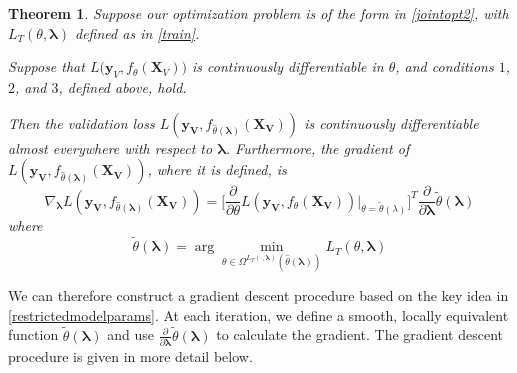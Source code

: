 \documentclass[10pt,letterpaper]{article}
\newtheorem{theorem}{Theorem}
\begin{document}
\begin{theorem}
Suppose our optimization problem is of the form in \eqref{jointopt2}, with $L_T\left(\theta, \boldsymbol{\lambda}\right)$ defined as in \eqref{train}.

Suppose that $L \Big( \boldsymbol{y}_V, f_{\theta}(\boldsymbol{X}_V)\Big)$ is continuously differentiable in $\theta$, and conditions $1$, $2$, and $3$, defined above, hold.

Then the validation loss $L(\boldsymbol{y_V}, f_{\hat \theta(\boldsymbol{\lambda})}(\boldsymbol{X_V}))$ is continuously differentiable almost everywhere with respect to $\boldsymbol{\lambda}$. Furthermore, the gradient of $L(\boldsymbol{y_V}, f_{\hat \theta(\boldsymbol{\lambda})}(\boldsymbol{X_V}))$, where it is defined, is
\begin{equation}
\nabla_{\boldsymbol{\lambda}} L(\boldsymbol{y_V}, f_{\hat \theta(\boldsymbol{\lambda})}(\boldsymbol{X_V})) = \Big [ \frac{\partial}{\partial \theta} L(\boldsymbol{y_V}, f_{\theta}(\boldsymbol{X_V})) |_{\theta=\tilde\theta(\lambda)} \Big ]^T \frac{\partial}{\partial \boldsymbol{\lambda}} \tilde{\theta}(\boldsymbol{\lambda})
\end{equation}
where
\begin{equation}
\tilde{\theta}(\boldsymbol{\lambda}) = \arg \min_{\theta \in \Omega^{L_T(\cdot, \boldsymbol{\lambda})}(\hat \theta(\boldsymbol{\lambda}))} L_T(\theta , \boldsymbol{\lambda})
\label{restrictedmodelparams}
\end{equation}
\label{thethrm}
\end{theorem}

We can therefore construct a gradient descent procedure based on the key idea in \eqref{restrictedmodelparams}. At each iteration, we define a smooth, locally equivalent function $\tilde{\theta}(\boldsymbol{\lambda})$ and use $\frac{\partial}{\partial \boldsymbol{\lambda}} \tilde{\theta}(\boldsymbol{\lambda})$ to calculate the gradient. The gradient descent procedure is given in more detail below.
\end{document}
